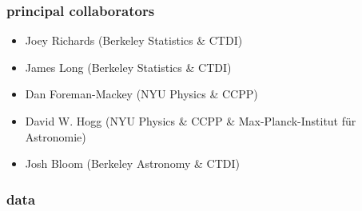 \documentclass[pdftex]{beamer}
\begin{document}
\begin{frame}
  \frametitle{principal collaborators}
  \begin{itemize}
  \item Joey Richards (Berkeley Statistics \& CTDI)
  \item James Long (Berkeley Statistics \& CTDI)
  \item Dan Foreman-Mackey (NYU Physics \& CCPP)
  \item David W. Hogg (NYU Physics \& CCPP \& Max-Planck-Institut f\"ur Astronomie)
  \item Josh Bloom (Berkeley Astronomy \& CTDI)
  \end{itemize}
\end{frame}

\begin{frame}
  \frametitle{ data}

\end{frame}
\end{document}
